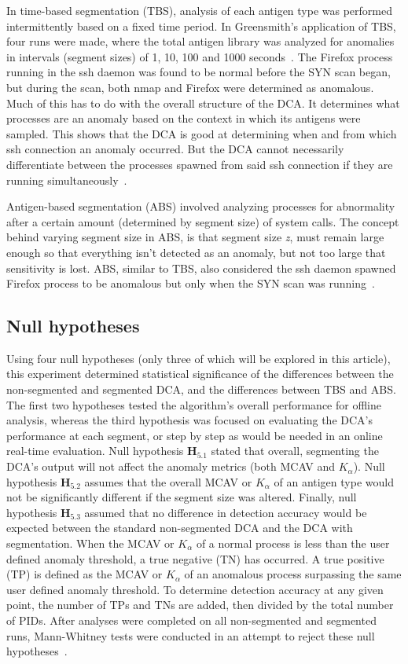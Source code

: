 \documentclass{umm-senior-sem}
\begin{document}
In time-based segmentation (TBS), analysis of each antigen type was performed intermittently based on a fixed time period. In Greensmith's application of TBS, four runs were made, where the total antigen library was analyzed for anomalies in intervals (segment sizes) of 1, 10, 100 and 1000 seconds~\cite{guSeg:2011}. The Firefox process running in the ssh daemon was found to be normal before the SYN scan began, but during the scan, both nmap and Firefox were determined as anomalous. Much of this has to do with the overall structure of the DCA. It determines what processes are an anomaly based on the context in which its antigens were sampled. This shows that the DCA is good at determining when and from which ssh connection an anomaly occurred. But the DCA cannot necessarily differentiate between the processes spawned from said ssh connection if they are running simultaneously~\cite{greensmith_thesis:2007}. 

Antigen-based segmentation (ABS) involved analyzing processes for abnormality after a certain amount (determined by segment size) of system calls. The concept behind varying segment size in ABS, is that segment size \textit{z}, must remain large enough so that everything isn't detected as an anomaly, but not too large that sensitivity is lost. ABS, similar to TBS, also considered the ssh daemon spawned Firefox process to be anomalous but only when the SYN scan was running~\cite{greensmith_thesis:2007}.

\subsection{Null hypotheses}
Using four null hypotheses (only three of which will be explored in this article), this experiment determined statistical significance of the differences between the non-segmented and segmented DCA, and the differences between TBS and ABS.
The first two hypotheses tested the algorithm's overall performance for offline analysis, whereas the third hypothesis was focused on evaluating the DCA's performance at each segment, or step by step as would be needed in an online real-time evaluation. 
Null hypothesis $\textbf{H}_{5.1}$ stated that overall, segmenting the DCA's output will not affect the anomaly metrics (both MCAV and $K_{\alpha}$). Null hypothesis $\textbf{H}_{5.2}$ assumes that the overall MCAV or $K_{\alpha}$ of an antigen type would not be significantly different if the segment size was altered. 
Finally, null hypothesis $\textbf{H}_{5.3}$ assumed that no difference in detection accuracy would be expected between the standard non-segmented DCA and the DCA with segmentation. When the MCAV or $K_\alpha$ of a normal process is less than the user defined anomaly threshold, a true negative (TN) has occurred. A true positive (TP) is defined as the MCAV or $K_\alpha$ of an anomalous process surpassing the same user defined anomaly threshold. To determine detection accuracy at any given point, the number of TPs and TNs are added, then divided by the total number of PIDs.
After analyses were completed on all non-segmented and segmented runs, Mann-Whitney tests were conducted in an attempt to reject these null hypotheses~\cite{guSeg:2011}.
\end{document}
